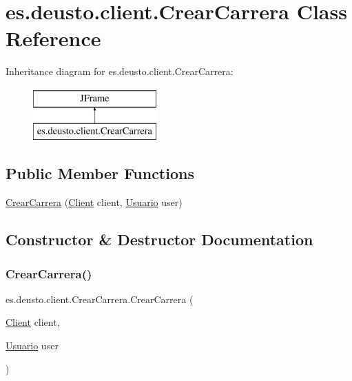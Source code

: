 \hypertarget{classes_1_1deusto_1_1client_1_1_crear_carrera}{}\section{es.\+deusto.\+client.\+Crear\+Carrera Class Reference}
\label{classes_1_1deusto_1_1client_1_1_crear_carrera}
Inheritance diagram for es.\+deusto.\+client.\+Crear\+Carrera\+:\begin{figure}[H]
\begin{center}
\leavevmode
\includegraphics[height=2.000000cm]{classes_1_1deusto_1_1client_1_1_crear_carrera}
\end{center}
\end{figure}
\subsection*{Public Member Functions}
\begin{DoxyCompactItemize}
\item 
\mbox{\hyperlink{classes_1_1deusto_1_1client_1_1_crear_carrera_ab7396c374d289ed38a61d07e6787c43b}{Crear\+Carrera}} (\mbox{\hyperlink{classes_1_1deusto_1_1client_1_1_client}{Client}} client, \mbox{\hyperlink{classes_1_1deusto_1_1server_1_1jdo_1_1_usuario}{Usuario}} user)
\end{DoxyCompactItemize}


\subsection{Constructor \& Destructor Documentation}
\mbox{\label{classes_1_1deusto_1_1client_1_1_crear_carrera_ab7396c374d289ed38a61d07e6787c43b}} 
\subsubsection{\texorpdfstring{CrearCarrera()}{CrearCarrera()}}
{\footnotesize\ttfamily es.\+deusto.\+client.\+Crear\+Carrera.\+Crear\+Carrera (\begin{DoxyParamCaption}\item[{\mbox{\hyperlink{classes_1_1deusto_1_1client_1_1_client}{Client}}}]{client,  }\item[{\mbox{\hyperlink{classes_1_1deusto_1_1server_1_1jdo_1_1_usuario}{Usuario}}}]{user }\end{DoxyParamCaption})}



